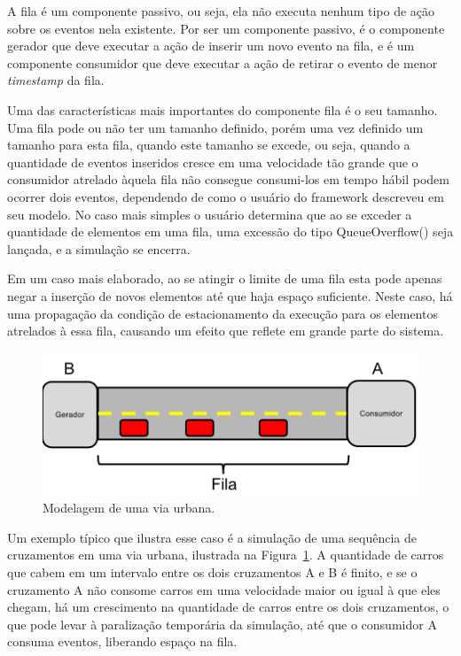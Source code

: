 A fila é um componente passivo, ou seja, ela não executa nenhum tipo de ação sobre os eventos nela existente. Por ser um componente passivo, é o componente gerador que deve executar a ação de inserir um novo evento na fila, e é um componente consumidor que deve executar a ação de retirar o evento de menor \textit{timestamp} da fila.

Uma das características mais importantes do componente fila é o seu tamanho. Uma fila pode ou não ter um tamanho definido, porém uma vez definido um tamanho para esta fila, quando este tamanho se excede, ou seja, quando a quantidade de eventos inseridos cresce em uma velocidade tão grande que o consumidor atrelado àquela fila não consegue consumi-los em tempo hábil podem ocorrer dois eventos, dependendo de como o usuário do framework descreveu em seu modelo. No caso mais simples o usuário determina que ao se exceder a quantidade de elementos em uma fila, uma excessão do tipo QueueOverflow() seja lançada, e a simulação se encerra.

Em um caso mais elaborado, ao se atingir o limite de uma fila esta pode apenas negar a inserção de novos elementos até que haja espaço suficiente. Neste caso, há uma propagação da condição de estacionamento da execução para os elementos atrelados à essa fila, causando um efeito que reflete em grande parte do sistema. 

\begin{figure}
  \centerline{\includegraphics{cruzamento.png}}
  \caption{Modelagem de uma via urbana.}
\label{fig:cruzamento}
\end{figure}

Um exemplo típico que ilustra esse caso é a simulação de uma sequência de cruzamentos em uma via urbana, ilustrada na Figura~\ref{fig:cruzamento}. A quantidade de carros que cabem em um intervalo entre os dois cruzamentos A e B é finito, e se o cruzamento A não consome carros em uma velocidade maior ou igual à que eles chegam, há um crescimento na quantidade de carros entre os dois cruzamentos, o que pode levar à paralização temporária da simulação, até que o consumidor A consuma eventos, liberando espaço na fila.

